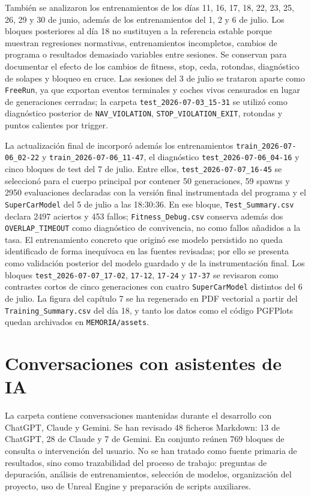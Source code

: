 También se analizaron los entrenamientos de los días 11, 16, 17, 18, 22, 23, 25, 26, 29 y 30 de junio, además de los entrenamientos del 1, 2 y 6 de julio. Los bloques posteriores al día 18 no sustituyen a la referencia estable porque muestran regresiones normativas, entrenamientos incompletos, cambios de programa o resultados demasiado variables entre sesiones. Se conservan para documentar el efecto de los cambios de fitness, stop, ceda, rotondas, diagnóstico de solapes y bloqueo en cruce. Las sesiones del 3 de julio se trataron aparte como \texttt{FreeRun}, ya que exportan eventos terminales y coches vivos censurados en lugar de generaciones cerradas; la carpeta \texttt{test\_2026-07-03\_15-31} se utilizó como diagnóstico posterior de \texttt{NAV\_VIOLATION}, \texttt{STOP\_VIOLATION\_EXIT}, rotondas y puntos calientes por trigger.

La actualización final de  incorporó además los entrenamientos \texttt{train\_2026-07-06\_02-22} y \texttt{train\_2026-07-06\_11-47}, el diagnóstico \texttt{test\_2026-07-06\_04-16} y cinco bloques de test del 7 de julio. Entre ellos, \texttt{test\_2026-07-07\_16-45} se seleccionó para el cuerpo principal por contener 50 generaciones, 59 spawns y 2950 evaluaciones declaradas con la versión final instrumentada del programa y el \texttt{SuperCarModel} del 5 de julio a las 18:30:36. En ese bloque, \texttt{Test\_Summary.csv} declara 2497 aciertos y 453 fallos; \texttt{Fitness\_Debug.csv} conserva además dos \texttt{OVERLAP\_TIMEOUT} como diagnóstico de convivencia, no como fallos añadidos a la tasa. El entrenamiento concreto que originó ese modelo persistido no queda identificado de forma inequívoca en las fuentes revisadas; por ello se presenta como validación posterior del modelo guardado y de la instrumentación final. Los bloques \texttt{test\_2026-07-07\_17-02}, \texttt{17-12}, \texttt{17-24} y \texttt{17-37} se revisaron como contrastes cortos de cinco generaciones con cuatro \texttt{SuperCarModel} distintos del 6 de julio. La figura del capítulo 7 se ha regenerado en PDF vectorial a partir del \texttt{Training\_Summary.csv} del día 18, y tanto los datos como el código PGFPlots quedan archivados en \texttt{MEMORIA/assets}.

\clearpage
\section{Conversaciones con asistentes de IA}

La carpeta  contiene conversaciones mantenidas durante el desarrollo con ChatGPT, Claude y Gemini. Se han revisado 48 ficheros Markdown: 13 de ChatGPT, 28 de Claude y 7 de Gemini. En conjunto reúnen 769 bloques de consulta o intervención del usuario. No se han tratado como fuente primaria de resultados, sino como trazabilidad del proceso de trabajo: preguntas de depuración, análisis de entrenamientos, selección de modelos, organización del proyecto, uso de Unreal Engine y preparación de scripts auxiliares.


